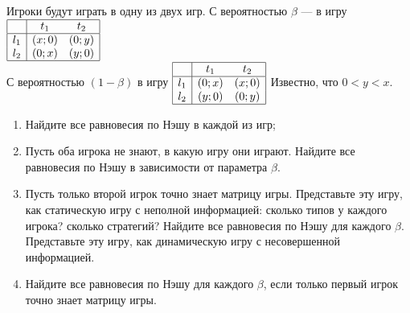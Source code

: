 \begin{problem}\par
\begin{source}\cite{polisci:lectures} \end{source}
Игроки будут играть в одну из двух игр.
С вероятностью  $\beta $  --- в игру  $\begin{array}{|c|cc|}  \hline {} & {t_{1} } & {t_{2} } \\  \hline {l_{1} } & {\left(x;0\right)} & {\left(0;y\right)} \\ {l_{2} } & {\left(0;x\right)} & {\left(y;0\right)} \\  \hline  \end{array}$  \\
С вероятностью  $\left(1-\beta \right)$  в игру  $\begin{array}{|c|cc|}  \hline {} & {t_{1} } & {t_{2} } \\  \hline {l_{1} } & {\left(0;x\right)} & {\left(x;0\right)} \\ {l_{2} } & {\left(y;0\right)} & {\left(0;y\right)} \\  \hline  \end{array}$
Известно, что  $0<y<x$.\par
\begin{enumerate}
\item	Найдите все равновесия по Нэшу в каждой из игр;\par
\item 	Пусть оба игрока не знают, в какую игру они играют. Найдите все равновесия по Нэшу в зависимости от параметра  $\beta $.\par
\item 	Пусть только второй игрок точно знает матрицу игры. Представьте эту игру, как статическую игру с неполной информацией: сколько типов у каждого игрока? сколько стратегий? Найдите все равновесия по Нэшу для каждого  $\beta $. Представьте эту игру, как динамическую игру с несовершенной информацией.\par
\item	Найдите все равновесия по Нэшу для каждого  $\beta $, если только первый игрок точно знает матрицу игры.\par
\end{enumerate}


\begin{sol}

\end{sol}
\end{problem}



